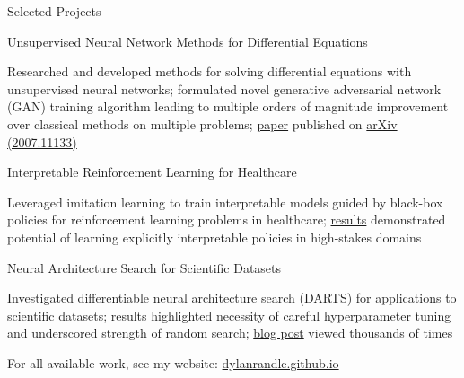 \documentclass{resume} %
\begin{document}
\begin{rSection}{Selected Projects}

\begin{rSubsection}{Unsupervised Neural Network Methods for Differential Equations}{}{}{}

  \item Researched and developed methods for solving differential equations with unsupervised neural networks; formulated novel generative adversarial network (GAN) training algorithm leading to multiple orders of magnitude improvement over classical methods on multiple problems; \href{https://dylanrandle.github.io/denn/deqgan.html}{paper} published on \href{https://arxiv.org/abs/2007.11133}{arXiv (2007.11133)}
  
\end{rSubsection}

\begin{rSubsection}{Interpretable Reinforcement Learning for Healthcare}{}{}{}

	\item Leveraged imitation learning to train interpretable models guided by black-box policies for reinforcement learning problems in healthcare; \href{https://dylanrandle.github.io/irl/irl.html}{results} demonstrated potential of learning explicitly interpretable policies in high-stakes domains
	
\end{rSubsection}

\begin{rSubsection}{Neural Architecture Search for Scientific Datasets}{}{}{}

  \item Investigated differentiable neural architecture search (DARTS) for applications to scientific datasets; results highlighted necessity of careful hyperparameter tuning and underscored strength of random search; \href{https://towardsdatascience.com/investigating-differentiable-neural-architecture-search-for-scientific-datasets-62899be8714e}{blog post} viewed thousands of times
  
\end{rSubsection}

%
%	

For all available work, see my website: \url{dylanrandle.github.io}

\end{rSection}
\end{document}
